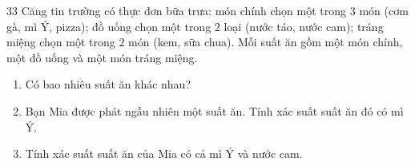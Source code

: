 \begin{probbox}{33}{\relax}
Căng tin trường có thực đơn bữa trưa: món chính chọn một trong $3$ món (cơm gà, mì Ý, pizza); đồ uống chọn một trong $2$ loại (nước táo, nước cam); tráng miệng chọn một trong $2$ món (kem, sữa chua). Mỗi suất ăn gồm một món chính, một đồ uống và một món tráng miệng.
\begin{enumerate}[label=\alph*),leftmargin=1.5em,itemsep=0pt,topsep=2pt]
\item Có bao nhiêu suất ăn khác nhau?
\item Bạn Mia được phát ngẫu nhiên một suất ăn. Tính xác suất suất ăn đó có mì Ý.
\item Tính xác suất suất ăn của Mia có cả mì Ý và nước cam.
\end{enumerate}
\end{probbox}
